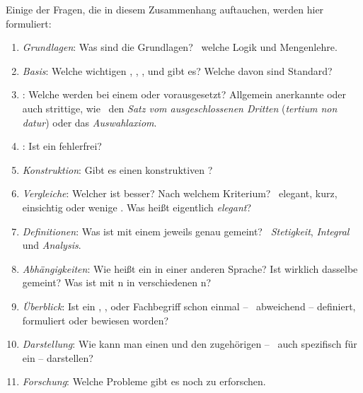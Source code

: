 Einige der Fragen, die in diesem Zusammenhang auftauchen,
werden hier formuliert:
\begin{enumerate}
	\item \label{Frage:Grundlagen} \emph{Grundlagen}:
	Was sind die Grundlagen?
	\textZB\ welche Logik und Mengenlehre.
	\item \label{Frage:Basis} \emph{Basis}:
	Welche wichtigen , , ,  und  gibt es?
	Welche davon sind Standard?
	\item \label{Frage:Axiome} \emph{}:
	Welche  werden bei einem  oder  vorausgesetzt?
	Allgemein anerkannte oder auch strittige, wie \textzB\ den \emph{Satz vom ausgeschlossenen Dritten} (\emph{tertium non datur}) oder das \emph{Auswahlaxiom}.
	\item \label{Frage:Beweis} \emph{}:
	Ist ein  fehlerfrei?
	\item \label{Frage:Konstruktion} \emph{Konstruktion}:
	Gibt es einen konstruktiven ?
	\item \label{Frage:Vergleiche} \emph{Vergleiche}:
	Welcher  ist besser?
	Nach welchem Kriterium?
	\textZB\ elegant, kurz, einsichtig oder wenige .
	Was heißt eigentlich \emph{elegant}?
	\item \label{Frage:Definitionen} \emph{Definitionen}:
	Was ist mit einem  jeweils genau gemeint?
	\textZB\ \emph{Stetigkeit}, \emph{Integral} und \emph{Analysis}.
	\item \label{Frage:Abhängigkeiten} \emph{Abhängigkeiten}:
	Wie heißt ein  in einer anderen Sprache?
	Ist wirklich dasselbe gemeint?
	Was ist mit n in verschiedenen n?
	\item \label{Frage:Überblick} \emph{Überblick}:
	Ist ein , ,  oder Fachbegriff schon einmal -- \textggf\ abweichend -- definiert, formuliert oder bewiesen worden?
	\item \label{Frage:Darstellung} \emph{Darstellung}:
	Wie kann man einen  und den zugehörigen  -- \textggf\ auch spezifisch für ein  -- darstellen?
	\item \label{Frage:Forschung} \emph{Forschung}:
	Welche Probleme gibt es noch zu erforschen.
\end{enumerate}

